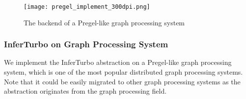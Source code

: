 \documentclass[conference]{IEEEtran}
\begin{document}



\begin{figure}
\centering
\texttt{[image: pregel\_implement\_300dpi.png]}
\caption{The backend of a Pregel-like graph processing system}
\label{fig:backend_of_pregel}
\end{figure}

\subsubsection{InferTurbo on Graph Processing System}
We implement the InferTurbo abstraction on a Pregel-like graph processing system, which is one of the most popular distributed graph processing systems.
Note that it could be easily migrated to other graph processing systems as the abstraction originates from the graph processing field.


\end{document}
